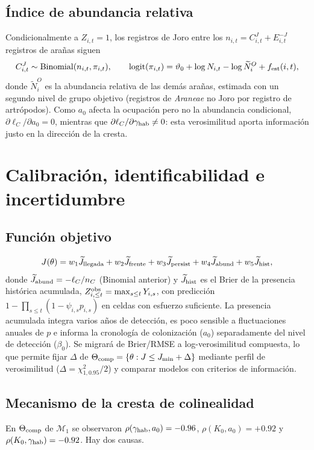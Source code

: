 \documentclass[11pt,letterpaper]{article}
\newcommand{\logit}{\operatorname{logit}}
\begin{document}
\subsection{Índice de abundancia relativa}
Condicionalmente a $Z_{i,t}=1$, los registros de Joro entre los $n_{i,t}=C^J_{i,t}+E^{-J}_{i,t}$ registros de arañas siguen
\begin{equation}
C^J_{i,t}\sim\operatorname{Binomial}(n_{i,t},\pi_{i,t}),\qquad
\logit(\pi_{i,t})=\vartheta_0+\log N_{i,t}-\log\widetilde N^{O}_{i}+f_{\rm est}(i,t),
\end{equation}
donde $\widetilde N^O_i$ es la abundancia relativa de las demás arañas, estimada con un segundo nivel de grupo objetivo (registros de \textit{Araneae} no Joro por registro de artrópodos). Como $a_0$ afecta la ocupación pero no la abundancia condicional, $\partial\ell_C/\partial a_0=0$, mientras que $\partial\ell_C/\partial\gamma_{\rm hab}\neq0$: esta verosimilitud aporta información justo en la dirección de la cresta.

\section{Calibración, identificabilidad e incertidumbre}
\label{sec:ident}
\subsection{Función objetivo}
\begin{equation}
J(\theta)=w_1\widetilde J_{\rm llegada}+w_2\widetilde J_{\rm frente}+w_3\widetilde J_{\rm persist}+w_4\widetilde J_{\rm abund}+w_5\widetilde J_{\rm hist},
\end{equation}
donde $\widetilde J_{\rm abund}=-\ell_C/n_C$ (Binomial anterior) y $\widetilde J_{\rm hist}$ es el Brier de la presencia histórica acumulada, $Z^{\rm obs}_{i,\le t}=\max_{s\le t}Y_{i,s}$, con predicción $1-\prod_{s\le t}(1-\psi_{i,s}p_{i,s})$ en celdas con esfuerzo suficiente. La presencia acumulada integra varios años de detección, es poco sensible a fluctuaciones anuales de $p$ e informa la cronología de colonización ($a_0$) separadamente del nivel de detección ($\beta_0$). Se migrará de Brier/RMSE a log-verosimilitud compuesta, lo que permite fijar $\Delta$ de $\Theta_{\rm comp}=\{\theta:J\le J_{\min}+\Delta\}$ mediante perfil de verosimilitud ($\Delta=\chi^2_{1,0.95}/2$) y comparar modelos con criterios de información.

\subsection{Mecanismo de la cresta de colinealidad}
En $\Theta_{\rm comp}$ de $\mathcal M_1$ se observaron $\rho(\gamma_{\rm hab},a_0)=-0.96$, $\rho(K_0,a_0)=+0.92$ y $\rho(K_0,\gamma_{\rm hab})=-0.92$. Hay dos causas.
\end{document}

